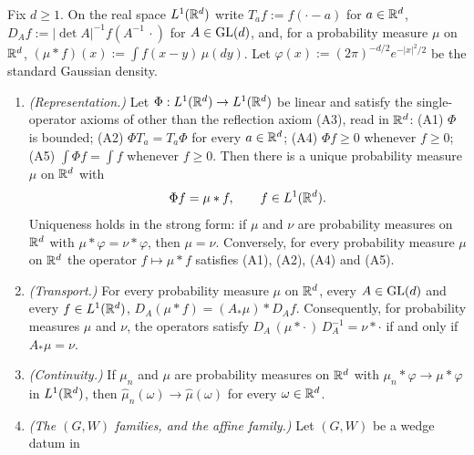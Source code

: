 \begin{lemma}
\label{lem:operators-to-kernels}
\leanok
Fix $d \ge 1$. On the real space $L^1(\mathbb{R}^d)$ write $T_af := f(\cdot - a)$ for $a \in \mathbb{R}^d$,
$D_Af := |\det A|^{-1}f(A^{-1}\,\cdot)$ for $A \in \mathrm{GL}(d)$, and, for a probability measure $\mu$
on $\mathbb{R}^d$, $(\mu * f)(x) := \int f(x - y)\,\mu(dy)$. Let $\varphi(x) := (2\pi)^{-d/2}e^{-|x|^2/2}$
be the standard Gaussian density.
\begin{enumerate}
\item \emph{(Representation.)} Let $\Phi : L^1(\mathbb{R}^d) \to L^1(\mathbb{R}^d)$ be linear and satisfy the
single-operator axioms of  other than the reflection axiom (A3), read in $\mathbb{R}^d$:
(A1) $\Phi$ is
bounded; (A2) $\Phi T_a = T_a\Phi$ for every $a \in \mathbb{R}^d$; (A4) $\Phi f \ge 0$ whenever
$f \ge 0$; (A5) $\int\Phi f = \int f$ whenever $f \ge 0$. Then there is a unique probability
measure $\mu$ on $\mathbb{R}^d$ with
\[
  \Phi f = \mu * f, \qquad f \in L^1(\mathbb{R}^d) .
\]
Uniqueness holds in the strong form: if $\mu$ and $\nu$ are probability measures on $\mathbb{R}^d$ with
$\mu * \varphi = \nu * \varphi$, then $\mu = \nu$. Conversely, for every probability measure $\mu$
on $\mathbb{R}^d$ the operator $f \mapsto \mu * f$ satisfies (A1), (A2), (A4) and (A5).
\item \emph{(Transport.)} For every probability measure $\mu$ on $\mathbb{R}^d$, every $A \in \mathrm{GL}(d)$ and
every $f \in L^1(\mathbb{R}^d)$, $D_A(\mu * f) = (A_*\mu) * D_Af$. Consequently, for probability measures
$\mu$ and $\nu$, the operators satisfy $D_A\,(\mu * \cdot\,)\,D_A^{-1} = \nu * \cdot$ if and only
if $A_*\mu = \nu$.
\item \emph{(Continuity.)} If $\mu_n$ and $\mu$ are probability measures on $\mathbb{R}^d$ with
$\mu_n * \varphi \to \mu * \varphi$ in $L^1(\mathbb{R}^d)$, then $\widehat\mu_n(\omega) \to
\widehat\mu(\omega)$ for every $\omega \in \mathbb{R}^d$.
\item \emph{(The $(G, W)$ families, and the affine family.)} Let $(G, W)$ be a wedge datum in

\end{enumerate}
\end{lemma}
